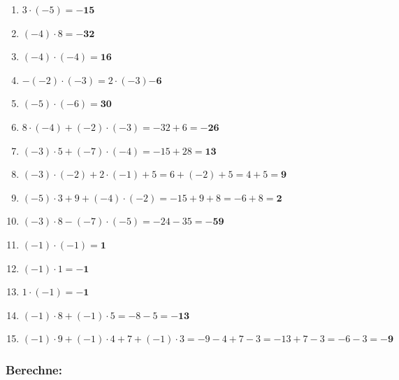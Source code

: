 \documentclass[a4paper,12pt]{article} %
\begin{document}
\begin{enumerate}[label=\alph*)]

  \item \(3 \cdot (-5) = \mathbf{-15}\) %

  \item \((-4) \cdot 8 = \mathbf{-32}\) %

  \item \((-4) \cdot (-4) = \mathbf{16}\) %

  \item \(-(-2) \cdot (-3) = 2 \cdot (-3) \mathbf{-6}\) %

  \item \((-5) \cdot (-6) = \mathbf{30}\) %

  \item \(8 \cdot (-4) + (-2) \cdot (-3) = -32 + 6 = \mathbf{-26}\) %

  \item \((-3) \cdot 5 + (-7) \cdot (-4) = -15 + 28 = \mathbf{13}\) %

  \item \((-3) \cdot (-2) + 2 \cdot (-1) + 5 = 6 + (-2) + 5 = 4 + 5 = \mathbf{9}\) %

  \item \((-5) \cdot 3 + 9 + (-4) \cdot (-2) = -15 + 9 + 8 = -6 + 8 = \mathbf{2}\) %

  \item \((-3) \cdot 8 - (-7) \cdot (-5) = -24 - 35 = \mathbf{-59}\) %

  \item \((-1) \cdot (-1) = \mathbf{1}\) %

  \item \((-1) \cdot 1 = \mathbf{-1}\) %

  \item \(1 \cdot (-1) = \mathbf{-1}\) %

  \item \((-1) \cdot 8 + (-1) \cdot 5 = -8 - 5 = \mathbf{-13}\) %

  \item \((-1) \cdot 9 + (-1) \cdot 4 + 7 + (-1) \cdot 3 = -9 - 4 + 7 - 3 =
    -13 + 7 - 3 = -6 - 3 = \mathbf{-9}\) %

  \end{enumerate}

\subsubsection{Berechne:} %
\end{document}
